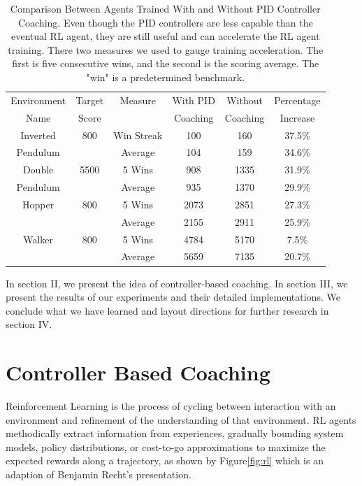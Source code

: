 \documentclass[journal]{IEEEtran}
\begin{document}
\begin{table}[H]
\scriptsize
\caption{Comparison Between Agents Trained With and Without PID Controller Coaching. Even though the PID controllers are less capable than the eventual RL agent, they are still useful and can accelerate the RL agent training. There two measures we used to gauge training acceleration. The first is five consecutive wins, and the second is the scoring average. The "win" is a predetermined benchmark. }
\label{episode_compare}
\centering
\begin{tabular}{ cccccc }
\rowcolor{airforceblue}

Environment & Target & Measure  &  With PID  & Without  & Percentage\\
\rowcolor{airforceblue}

   Name     & Score  &              & Coaching  & Coaching  & Increase \\
\hline
Inverted & 800& Win Streak & 100 & 160&  37.5\% \\
Pendulum & &Average  & 104 &  159&  34.6\%\\
\rowcolor{beaublue}
Double & 5500& 5 Wins & 908 & 1335&  31.9\%\\
\rowcolor{beaublue}
Pendulum & &Average & 935 &  1370&  29.9\%\\
Hopper & 800& 5 Wins & 2073 & 2851&  27.3\%\\
       & &Average  & 2155 &  2911&  25.9\%\\
\rowcolor{beaublue}
Walker & 800& 5 Wins & 4784 & 5170&  7.5\%\\
\rowcolor{beaublue}
       & &Average  & 5659 &  7135&  20.7\%\\

\end{tabular}
\end{table}

In section II, we present the idea of controller-based coaching. In section III, we present the results of our experiments and their detailed implementations. We conclude what we have learned and layout directions for further research in section IV.

\section{Controller Based Coaching}
Reinforcement Learning is the process of cycling between interaction with an environment and refinement of the understanding of that environment. RL agents methodically extract information from experiences, gradually bounding system models, policy distributions, or cost-to-go approximations to maximize the expected rewards along a trajectory, as shown by Figure\ref{fig:rl} which is an adaption of Benjamin Recht's presentation\cite{Recht2018ATO}. 
\end{document}
